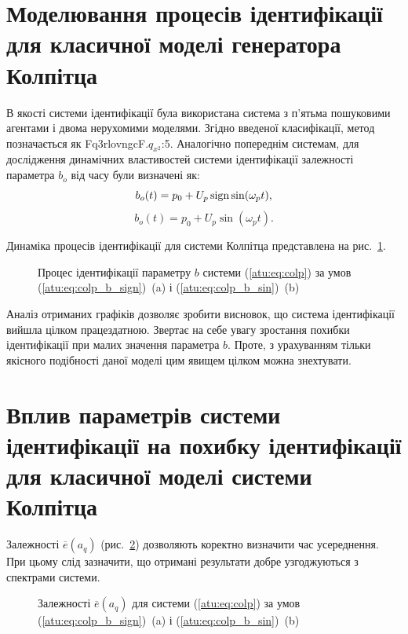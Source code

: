 \section{Моделювання процесів ідентифікації для класичної моделі генератора Колпітца} %

В якості системи ідентифікації була використана система з
п'ятьма пошуковими агентами і двома нерухомими моделями. Згідно
введеної класифікації, метод позначається як Fq3rlovngcF.$q_{x^2}$:5.
Аналогічно попереднім системам, для дослідження
динамічних властивостей системи ідентифікації залежності параметра
$b_o $ від часу були визначені як:
%
\begin{equation}
 b_o(t) = p_0 + U_p \operatorname*{sign} \sin( \omega_p t ),
  \label{atu:eq:colp_b_sign}
\end{equation}
%
\begin{equation}
 b_o(t) = p_0 + U_p \sin( \omega_p t ).
  \label{atu:eq:colp_b_sin}
\end{equation}

Динаміка процесів ідентифікації для системи Колпітца
представлена на рис.~\ref{atu:f:colp_id}.

\begin{figure}[htb!]
\caption{Процес ідентифікації параметру $b$ системи (\ref{atu:eq:colp})
  за умов (\ref{atu:eq:colp_b_sign})~(a) і (\ref{atu:eq:colp_b_sin})~(b)
}
\label{atu:f:colp_id}
\end{figure}

Аналіз отриманих графіків дозволяє зробити висновок, що
система ідентифікації вийшла цілком працездатною. Звертає
на себе увагу зростання похибки ідентифікації при малих
значення параметра
$b$. Проте, з урахуванням тільки якісного подібності даної
моделі цим явищем цілком можна знехтувати.


\section{Вплив параметрів системи ідентифікації на похибку ідентифікації для класичної моделі системи Колпітца} %

Залежності
$\overline{e} (a_q) $ (рис.~\ref{atu:f:colp_e_a_q}) дозволяють коректно визначити час
усереднення. При цьому слід зазначити, що отримані результати
добре узгоджуються з спектрами системи.

\begin{figure}[htb!]
  \caption{Залежності  $\overline{e}(a_q)$ для системи (\ref{atu:eq:colp})
  за умов (\ref{atu:eq:colp_b_sign})~(a) і (\ref{atu:eq:colp_b_sin})~(b)
}
\label{atu:f:colp_e_a_q}
\end{figure}

